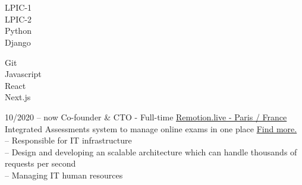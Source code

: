 \documentclass[9pt]{developercv}
\begin{document}
\\\\
\begin{minipage}[t]{0.49\textwidth}
	\huge
	\vspace{-\baselineskip}

	\faCircle \; {LPIC-1}\\
	\faCircle \; {LPIC-2}\\
	\faCircle \; {Python}\\
	\faCircle \; {Django}\\
\end{minipage}
\begin{minipage}[t]{0.50\textwidth}
	\huge
	\vspace{-\baselineskip}

	\faCircle \; {Git}\\
	\faCircle \; {Javascript}\\
	\faCircle \; {React}\\
	\faCircle \; {Next.js}\\
\end{minipage}

\hfill

\begin{entrylist}
	\entry
	{10/2020 -- now}
	{Co-founder \& CTO - Full-time}
	{\href{https://remotion.live/}{Remotion.live - Paris / France }}
	{Integrated Assessments system to manage online exams in one place  \href{https://remotion.live/}{Find more.} \\
		-- Responsible for IT infrastructure  \\
		-- Design and developing an scalable architecture which can handle thousands of requests per second \\
		-- Managing IT human resources \\
	}
\end{entrylist}
\end{document}
